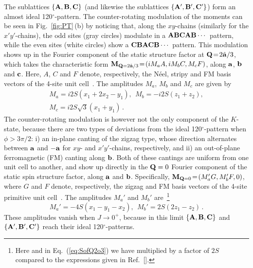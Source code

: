 \documentclass[prx,aps,groupedaddress,twocolumn]{revtex4-1}
\def\be{\begin{equation}}
\def\ee{\end{equation}}
\begin{document}
The sublattices $\{{\bf A}, {\bf B}, {\bf C}\}$ (and likewise the sublattices  $\{{\bf A}', {\bf B}', {\bf C}'\}$) form an almost ideal 120$^\circ$-pattern. 
%
The counter-rotating modulation of the moments can be seen in Fig.~\ref{fig:PT}\,(b) by noticing that, along the $xy$-chains (similarly for the $x'y'$-chains), the odd sites (gray circles) modulate in a ${\bf A B C A B} \cdots$ pattern, while the even sites (white circles) show a ${\bf C B A C B}\cdots$ pattern.
%
This modulation shows up in the Fourier component of the static structure factor at ${\bf Q}\!=\!2\hat{\bf a}/3$, which takes the characteristic form ${\bf M}_{{\bf Q}={2\hat{{\bf a}}/3}}\!=\!(i M_a A, i M_b C, M_c F)$, along ${\bf a}$, ${\bf b}$ and ${\bf c}$. Here, $A$, $C$ and $F$ denote, respectively, the N\'eel, stripy and FM basis vectors of the 4-site unit cell~\cite{Biffin2014a,Sam2018}. The amplitudes $M_a$, $M_b$ and $M_c$ are given by~\cite{Sam2018}
\be\label{eq:SofQ2o3}
\begin{array}{c}
M_a=i 2S (x_1+2x_2-y_1),~~M_b=-i2S (z_1+z_2),\\
M_c=i 2S \sqrt{3}(x_1+y_1)\,.
\end{array}
\ee
The counter-rotating modulation is however not the only component of the $K$-state, because there are two types of deviations from the ideal 120$^\circ$-pattern when $\phi\!>\!3\pi/2$: 
%
i) an in-plane canting of the zigzag type, whose direction alternates between ${\bf a}$ and $-{\bf a}$ for $xy$- and $x'y'$-chains, respectively, and ii) an out-of-plane ferromagnetic (FM) canting along ${\bf b}$. 
%
Both of these cantings are uniform from one unit cell to another, and show up directly in the ${\bf Q}=0$ Fourier component of the static spin structure factor, along ${\bf a}$ and ${\bf b}$. Specifically, ${\bf M}_{{\bf Q}=0}\!=\!(M_a' G, M_b' F, 0)$, where $G$ and $F$ denote, respectively, the zigzag and FM basis vectors of the 4-site primitive unit cell~\cite{Biffin2014a,Sam2018}. 
%
The amplitudes $M_a'$ and $M_b'$ are~\footnote{Here and in Eq.~(\ref{eq:SofQ2o3}) we have multiplied by a factor of $2S$ compared to the expressions given in Ref.~[].}  
\be\label{eq:SofQ0}
M_a' = -4S(x_1-y_1-x_2), ~~ M_b' = 2S (2z_1-z_2)\,.
\ee
These amplitudes vanish when $J\to 0^+$, because in this limit $\{{\bf A}, {\bf B}, {\bf C}\}$ and $\{{\bf A}', {\bf B}', {\bf C}'\}$ reach their ideal 120$^\circ$-patterns. 





\vspace*{-0.25cm} 
\end{document}

